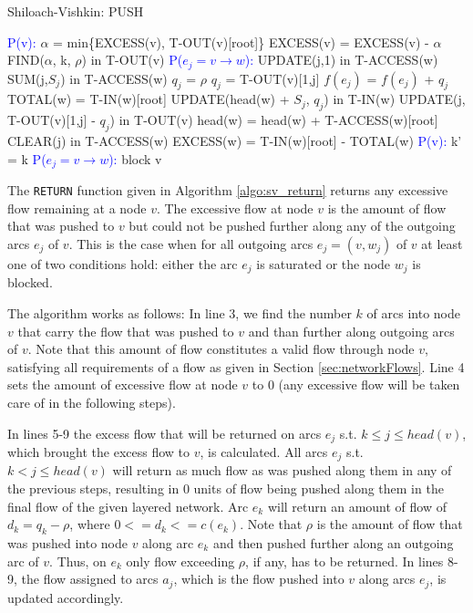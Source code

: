 \documentclass[a4paper,10pt, twocolumn]{article}
\begin{document}
\begin{algorithm}
\caption{Shiloach-Vishkin: PUSH}
\label{algo:sv_push}
\begin{algorithmic}[1]
		\State \textcolor{blue}{P(v):}
		\State $\alpha$ = min\{EXCESS(v), T-OUT(v)[root]\} 
		\State EXCESS(v) = EXCESS(v) - $\alpha$
		\State FIND($\alpha$, k, $\rho$) in T-OUT(v)
		\State \textcolor{blue}{P($e_j = v \rightarrow w$):}
 		\State UPDATE(j,1) in T-ACCESS(w)
		\State SUM(j,$S_j$) in T-ACCESS(w)
			$q_j$ = $\rho$
		\Else
			\State $q_j$ = T-OUT(v)[1,j]
		\EndIf
		\State $f(e_j)$ = $f(e_j)$ + $q_j$
		\State TOTAL(w) = T-IN(w)[root]
		\State UPDATE(head(w) + $S_j$, $q_j$) in T-IN(w)
		\State UPDATE(j, T-OUT(v)[1,j] - $q_j$) in T-OUT(v)
		\State head(w) = head(w) + T-ACCESS(w)[root] 
		\State CLEAR(j) in T-ACCESS(w)
		\State EXCESS(w) = T-IN(w)[root] - TOTAL(w)
		\EndIf
		\State \textcolor{blue}{P(v):} k' = k
		\State \textcolor{blue}{P($e_j = v \rightarrow w$):}
			\State block v
		\EndIf
 	\EndFunction
\end{algorithmic}
\end{algorithm}

The \lstinline|RETURN| function given in Algorithm \ref{algo:sv_return} returns any excessive flow remaining at a node $v$. The excessive flow at node $v$ is the amount of flow that was pushed to $v$ but could not be pushed further along any of the outgoing arcs $e_j$ of $v$. This is the case when for all outgoing arcs $e_j = (v ,w_j)$ of $v$ at least one of two conditions hold: either the arc $e_j$ is saturated or the node $w_j$ is blocked. 

The algorithm works as follows: In line 3, we find the number $k$ of arcs into node $v$ that carry the flow that was pushed to $v$ and than further along outgoing arcs of $v$. Note that this amount of flow constitutes a valid flow through node $v$, satisfying all requirements of a flow as given in Section \ref{sec:networkFlows}. Line 4 sets the amount of excessive flow at node $v$ to 0 (any excessive flow will be taken care of in the following steps).

In lines 5-9 the excess flow that will be returned on arcs $e_j$ s.t. $k \leq j \leq head(v)$, which brought the excess flow to $v$, is calculated. All arcs $e_j$ s.t. $k<j \leq head(v)$ will return as much flow as was pushed along them in any of the previous steps, resulting in 0 units of flow being pushed along them in the final flow of the given layered network. Arc $e_k$ will return an amount of flow of $d_k = q_k - \rho$, where $0 <= d_k <= c(e_k)$. Note that $\rho$ is the amount of flow that was pushed into node $v$ along arc $e_k$ and then pushed further along an outgoing arc of $v$. Thus, on $e_k$ only flow exceeding $\rho$, if any, has to be returned. In lines 8-9, the flow assigned to arcs $a_j$, which is the flow pushed into $v$ along arcs $e_j$, is updated accordingly.
\end{document}
